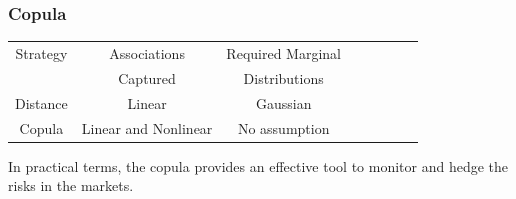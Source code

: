 \documentclass[pdf,10pt,xcolor=dvipsnames,hide notes]{beamer}
\begin{document}
\begin{frame}[label=frame4b]
	\frametitle{Copula}
	
	
		
		
	
		
		
		
		\begin{table}[ht]
			\centering
			\begin{tabular}{c|ccccccc}
				\hline
				\rowcolor{corn}
				Strategy & Associations & Required Marginal \\
				\rowcolor{corn}
				& Captured & Distributions \\
				\hline
				Distance& Linear & Gaussian \\
				Copula& Linear and Nonlinear & No assumption \\
				\hline
			\end{tabular}
		\end{table}
	
	\begin{exampleblock}
		\centering
		In practical terms, the copula provides an effective tool to monitor and hedge the risks in the markets.
	\end{exampleblock}

		
\end{frame}
\end{document}
